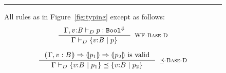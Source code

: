 \begin{figure}[t!]
\hrule width 0.48\textwidth \vspace{0.05in}
All rules as in Figure~\ref{fig:typing} except as follows: \\

$$
\inference{
	\dechastype{\Gamma, v\colon \Base}{\restrictdecidable{p}{r}}{\FinTy{\tbool}}
}{
	\deciswellformed{\Gamma}{\tref{v}{\Base}{}{\restrictdecidable{p}{r}}}
}[\rwbased]
$$


$$
\inference{
  \VCOND{\Env, v:B}{p_1}{p_2}\ \mbox{is valid}
}{
	\decissubtype{\Gamma}
		{\tref{v}{B}{}{\restrictdecidable{p_1}{e_1}}}
		{\tref{v}{B}{}{\restrictdecidable{p_2}{e_2}}}
}[\rsubbased]
\samerule{\qquad
\inference{
	\decissubtype{\Gamma}{\tau'_x}{\tau_x} &&
	\decissubtype{\Gamma, x \colon \tau'_x}{\tau}{\tau'}
}{
	\decissubtype{\Gamma}{\tfunref{x}{\tau_x}{\tau}{v}{e_1}}{\tfunref{x}{\tau'_x}{\tau'}{v}{e_2}}
}[\rsubfun]
}$$

\end{figure}
